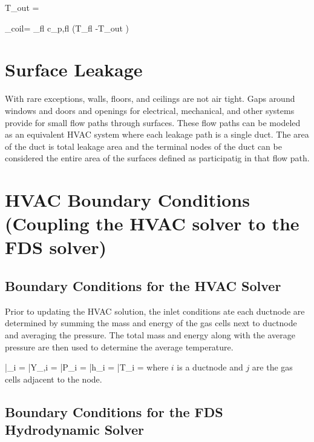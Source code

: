 \be T_{out} =  \ee

\be {}_{coil}= _{fl} c_{p,fl} \left(T_{fl} -T_{out} \right) \eta \ee

\section{Surface Leakage}

With rare exceptions, walls, floors, and ceilings are not air tight.  Gaps around windows and doors and openings for electrical, mechanical, and other systems provide for small flow paths through surfaces.  These flow paths can be modeled as an equivalent HVAC system where each leakage path is a single duct.  The area of the duct is total leakage area and the terminal nodes of the duct can be considered the entire area of the surfaces defined as participatig in that flow path.

\section{HVAC Boundary Conditions (Coupling the HVAC solver to the FDS solver)}

\subsection{Boundary Conditions for the HVAC Solver}

Prior to updating the HVAC solution, the inlet conditions ate each ductnode are determined by summing the mass and energy of the gas cells next to ductnode and averaging the pressure.  The total mass and energy along with the average pressure are then used to determine the average temperature.


\be \bar{\rho}_i =   \ee
\be \bar{Y}_{\alpha,i} =   \ee
\be \bar{P}_i =   \ee
\be \bar{h}_i =   \ee
\be \bar{T}_i =  \ee
where $i$ is a ductnode and $j$ are the gas cells adjacent to the node.

\subsection{Boundary Conditions for the FDS Hydrodynamic Solver}

